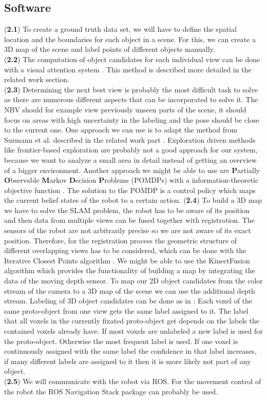 \documentclass[a4paper,11pt,english]{article}
\begin{document}
\subsection{Software}
(\textbf{2.1}) To create a ground truth data set, we will have to define the spatial location and the boundaries for each object in a scene.
For this, we can create a 3D map of the scene and label points of different objects manually.\\
(\textbf{2.2}) The computation of object candidates for each individual view can be done with a visual attention system \cite{garcia2013computational}.
This method is described more detailed in the related work section.\\
(\textbf{2.3}) Determining the next best view is probably the most difficult task to solve as there are numerous different aspects that can be incorporated to solve it.
The NBV should for example view previously unseen parts of the scene, it should focus on areas with high uncertainty in the labeling and the pose should be close to the current one.
One approach we can use is to adapt the method from Surmann et al. described in the related work part \cite{surmann2003autonomous}.
Exploration driven methods like frontier-based exploration are probably not a good approach for our system, because we want to analyze a small area in detail instead of getting an overview of a bigger environment.
Another approach we might be able to use are \textbf{P}artially \textbf{O}bservable \textbf{M}arkov \textbf{D}ecision \textbf{P}roblems (POMDPs) with a information-theoretic objective function \cite{lauri2015planning}.
The solution to the POMDP is a control policy which maps the current belief states of the robot to a certain action.
(\textbf{2.4}) To build a 3D map we have to solve the SLAM problem, the robot has to be aware of its position and then data from multiple views can be fused together with registration.
The sensors of the robot are not arbitrarily precise so we are not aware of its exact position. Therefore, for the registration process the geometric structure of different overlapping views has to be considered, which can be done with the Iterative Closest Points algorithm \cite{surmann2003autonomous}.
We might be able to use the KinectFusion algorithm which provides the functionality of building a map by integrating the data of the moving depth sensor.
To map our 2D object candidates from the color stream of the camera to a 3D map of the scene we can use the additional depth stream.
Labeling of 3D object candidates can be done as in \cite{garcia2013computational}:
Each voxel of the same proto-object from one view gets the same label assigned to it.
The label that all voxels in the currently fixated proto-object get depends on the labels the contained voxels already have.
If most voxels are unlabeled a new label is used for the proto-object.
Otherwise the most frequent label is used.
If one voxel is continuously assigned with the same label the confidence in that label increases, if many different labels are assigned to it then it is more likely not part of any object.\\
(\textbf{2.5}) We will communicate with the robot via ROS. For the movement control of the robot the ROS Navigation Stack package can probably be used.
\end{document}
